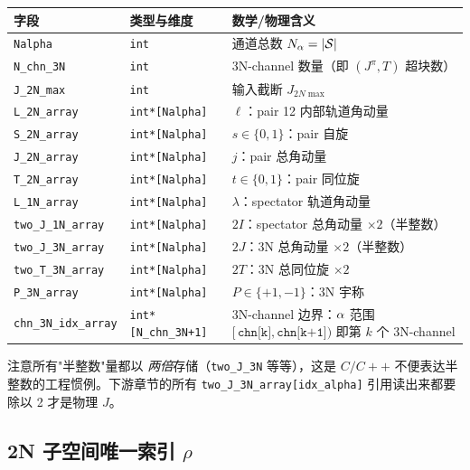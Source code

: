 \begin{center}
\begin{tabularx}{\textwidth}{lXX}
\toprule
字段 & 类型与维度 & 数学/物理含义 \\
\midrule
\texttt{Nalpha} & \texttt{int} & 通道总数 \(N_\alpha = |\mathcal{S}|\) \\
\texttt{N\_chn\_3N} & \texttt{int} & 3N-channel 数量（即 \((J^\pi, T)\) 超块数） \\
\texttt{J\_2N\_max} & \texttt{int} & 输入截断 \(J_{2N\max}\) \\
\texttt{L\_2N\_array} & \texttt{int*[Nalpha]} & \(\ell\)：pair 12 内部轨道角动量 \\
\texttt{S\_2N\_array} & \texttt{int*[Nalpha]} & \(s \in \{0,1\}\)：pair 自旋 \\
\texttt{J\_2N\_array} & \texttt{int*[Nalpha]} & \(j\)：pair 总角动量 \\
\texttt{T\_2N\_array} & \texttt{int*[Nalpha]} & \(t \in \{0,1\}\)：pair 同位旋 \\
\texttt{L\_1N\_array} & \texttt{int*[Nalpha]} & \(\lambda\)：spectator 轨道角动量 \\
\texttt{two\_J\_1N\_array} & \texttt{int*[Nalpha]} & \(2I\)：spectator 总角动量 \(\times 2\)（半整数） \\
\texttt{two\_J\_3N\_array} & \texttt{int*[Nalpha]} & \(2J\)：3N 总角动量 \(\times 2\)（半整数） \\
\texttt{two\_T\_3N\_array} & \texttt{int*[Nalpha]} & \(2T\)：3N 总同位旋 \(\times 2\) \\
\texttt{P\_3N\_array} & \texttt{int*[Nalpha]} & \(P \in \{+1, -1\}\)：3N 宇称 \\
\texttt{chn\_3N\_idx\_array} & \texttt{int*[N\_chn\_3N+1]} &
3N-channel 边界：\(\alpha\) 范围 \([\,\texttt{chn[k]}, \texttt{chn[k+1]})\) 即第 \(k\) 个 3N-channel \\
\bottomrule
\end{tabularx}
\end{center}

注意所有"半整数"量都以 \emph{两倍}存储（\texttt{two\_J\_3N} 等等），这是
\(C/C++\) 不便表达半整数的工程惯例。下游章节的所有
\texttt{two\_J\_3N\_array[idx\_alpha]} 引用读出来都要除以 2 才是物理 \(J\)。

\subsection{2N 子空间唯一索引 \(\rho\)}
\label{subsec:ch07-2N-idx}


